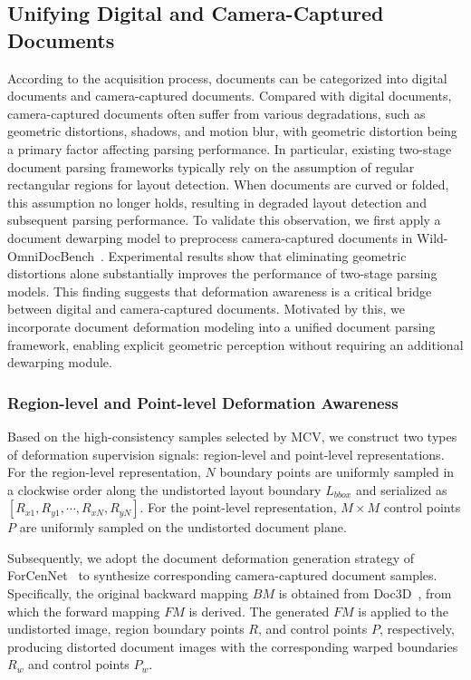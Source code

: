 \documentclass{fairmeta}
\begin{document}
\subsection{Unifying Digital and Camera-Captured Documents}
According to the acquisition process, documents can be categorized into digital documents and camera-captured documents. Compared with digital documents, camera-captured documents often suffer from various degradations, such as geometric distortions, shadows, and motion blur, with geometric distortion being a primary factor affecting parsing performance. In particular, existing two-stage document parsing frameworks typically rely on the assumption of regular rectangular regions for layout detection. When documents are curved or folded, this assumption no longer holds, resulting in degraded layout detection and subsequent parsing performance. To validate this observation, we first apply a document dewarping model to preprocess camera-captured documents in Wild-OmniDocBench~\cite{li2026towards}. Experimental results show that eliminating geometric distortions alone substantially improves the performance of two-stage parsing models. This finding suggests that deformation awareness is a critical bridge between digital and camera-captured documents. Motivated by this, we incorporate document deformation modeling into a unified document parsing framework, enabling explicit geometric perception without requiring an additional dewarping module.

\subsubsection{Region-level and Point-level Deformation Awareness}

Based on the high-consistency samples selected by MCV, we construct two types of deformation supervision signals: region-level and point-level representations. For the region-level representation, $N$ boundary points are uniformly sampled in a clockwise order along the undistorted layout boundary $L_{bbox}$ and serialized as $[R_{x1},R_{y1},\cdots,R_{xN},R_{yN}]$. For the point-level representation, $M\times M$ control points $P$ are uniformly sampled on the undistorted document plane.

Subsequently, we adopt the document deformation generation strategy of ForCenNet~\cite{cai2025forcennet} to synthesize corresponding camera-captured document samples. Specifically, the original backward mapping $BM$ is obtained from Doc3D~\cite{das2019dewarpnet}, from which the forward mapping $FM$ is derived. The generated $FM$ is applied to the undistorted image, region boundary points $R$, and control points $P$, respectively, producing distorted document images with the corresponding warped boundaries $R_w$ and control points $P_w$.
\end{document}
